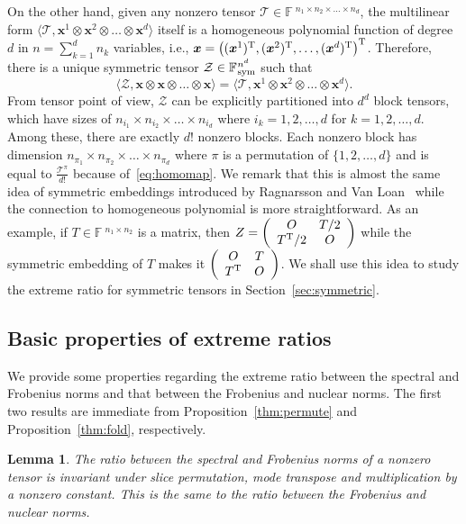 \documentclass[11pt]{article}
\newtheorem{lemma}[theorem]{Lemma}
\newcommand{\BF}{\mathbb{F}\:\!}
\newcommand{\Z}{\mathcal{Z}}
\newcommand{\TT}{\mathcal{T}}
\newcommand{\bx}{\boldsymbol{x}}
\newcommand{\T}{\textnormal{T}}
\newcommand{\sym}{\textnormal{sym}}
\begin{document}
On the other hand, given any nonzero tensor $\TT\in\BF^{n_1\times n_2\times\dots\times n_d}$, the multilinear form $\langle \TT, \bx^1\otimes\bx^2\otimes \dots\otimes \bx^d \rangle$ itself is a homogeneous polynomial function of degree $d$ in $n=\sum_{k=1}^dn_k$ variables, i.e., $\bx=\left((\bx^1)^{\T},(\bx^2)^{\T},\dots,(\bx^d)^{\T}\right)^{\T}$. Therefore, there is a unique symmetric tensor $\Z\in\BF^{n^d}_\sym$ such that
\begin{equation}\label{eq:homomap}
  \langle\Z, \bx\otimes \bx \otimes \dots \otimes \bx\rangle = \langle\TT, \bx^1\otimes \bx^2 \otimes \dots \otimes \bx^d\rangle.
\end{equation}
From tensor point of view, $\Z$ can be explicitly partitioned into $d^d$ block tensors, which have sizes of $n_{i_1}\times n_{i_2}\times \dots \times n_{i_d}$ where $i_k=1,2,\dots,d$ for $k=1,2,\dots,d$. Among these, there are exactly $d!$ nonzero blocks. Each nonzero block has dimension $n_{\pi_1}\times n_{\pi_2}\times \dots \times n_{\pi_d}$ where $\pi$ is a permutation of $\{1,2,\dots,d\}$ and is equal to $\frac{\TT^\pi}{d!}$ because of~\eqref{eq:homomap}. We remark that this is almost the same idea of symmetric embeddings introduced by Ragnarsson and Van Loan~\cite{RV13} while the connection to homogeneous polynomial is more straightforward. As an example, if $T\in\BF^{n_1\times n_2}$ is a matrix, then $Z=\left(
\begin{array}{cc} O & T/2 \\ T^{\T}/2 & O \end{array}
\right)$ while the symmetric embedding of $T$ makes it $\left(
\begin{array}{cc} O & T \\ T^{\T} & O \end{array}
\right)$. We shall use this idea to study the extreme ratio for symmetric tensors in Section~\ref{sec:symmetric}.

\subsection{Basic properties of extreme ratios}

We provide some properties regarding the extreme ratio between the spectral and Frobenius norms and that between the Frobenius and nuclear norms. The first two results are immediate from Proposition~\ref{thm:permute} and Proposition~\ref{thm:fold}, respectively.

\begin{lemma}\label{thm:permute2}
The ratio between the spectral and Frobenius norms of a nonzero tensor is invariant under slice permutation, mode transpose and multiplication by a nonzero constant. This is the same to the ratio between the Frobenius and nuclear norms.
\end{lemma}
\end{document}
